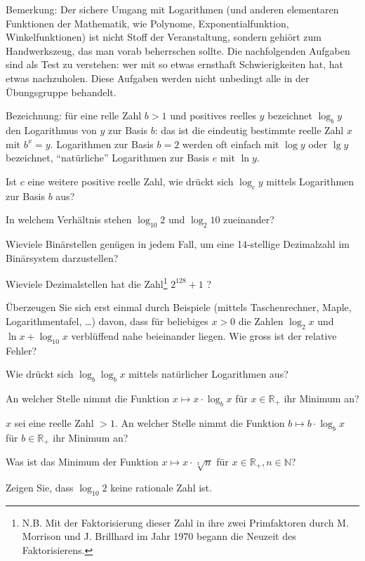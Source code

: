 
Bemerkung: Der sichere Umgang mit Logarithmen (und anderen elementaren
Funktionen der Mathematik, wie Polynome, Exponentialfunktion,
Winkelfunktionen) ist nicht Stoff der Veranstaltung,
sondern gehiört zum Handwerkszeug, das man vorab beherrschen sollte.
Die nachfolgenden Aufgaben sind als Test zu verstehen: wer mit so etwas
ernsthaft Schwierigkeiten hat, hat etwas nachzuholen.
Diese Aufgaben werden nicht unbedingt alle in der Übungsgruppe behandelt.

Bezeichnung: für eine relle Zahl $b>1$ und positives reelles $y$ bezeichnet
$\log_b y$  den Logarithmus von $y$ zur Basis $b$: das ist die eindeutig
bestimmte reelle Zahl $x$ mit $b^x = y$.  Logarithmen zur Basis $b=2$ werden
oft einfach mit $\log y$ oder $\lg y$ bezeichnet, ``natürliche'' Logarithmen
zur Basis $e$ mit $\ln y$.

\begin{flushenum}
\item
Ist $c$ eine weitere positive reelle Zahl, wie  drückt sich $\log_c y$
mittels Logarithmen zur Basis $b$ aus?
\item
In welchem Verhältnis stehen $\log_{10}2$ und $\log_2 10$ zueinander?
\item
Wieviele Binärstellen genügen in jedem Fall, 
um eine 14-stellige Dezimalzahl im Binärsystem darzustellen?
\item
Wieviele Dezimalstellen hat die Zahl\footnote{
N.B. Mit der Faktorisierung dieser Zahl in ihre zwei Primfaktoren
durch M. Morrison und J. Brillhard 
im Jahr 1970 begann die Neuzeit des Faktorisierens.} $2^{128}+1$ ?
\item
\"Uberzeugen Sie sich erst einmal durch Beispiele 
(mittels Taschenrechner, Maple, Logarithmentafel, \ldots) davon, 
dass für beliebiges $x >0$ die Zahlen
$\log_2 x$ und $\ln x + \log_{10} x$ verblüffend nahe beieinander liegen. 
Wie gross ist der relative Fehler?
\item
Wie drückt sich $\log_b \log_b x$ mittels natürlicher Logarithmen aus?
\item
An welcher Stelle nimmt die Funktion 
$x \mapsto x \cdot \log_b x$ für $x \in \mathbb{R}_+$
ihr Minimum an? 
\item
$x$ sei eine reelle Zahl $>1$. An welcher Stelle nimmt die Funktion 
$b \mapsto b \cdot \log_b x$ für $b \in \mathbb{R}_+$
ihr Minimum an? 
\item
Was ist das Minimum der Funktion 
$x \mapsto x \cdot \sqrt[x]{n}$ für $x \in \mathbb{R}_+, n \in \mathbb{N}$?
\item
Zeigen Sie, dass $\log_{10} 2$ keine rationale Zahl ist.

\end{flushenum}


